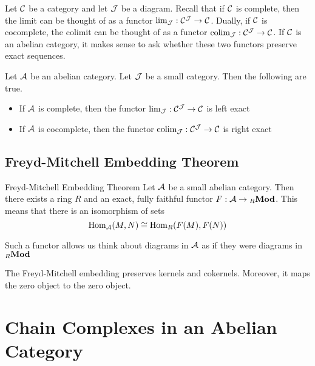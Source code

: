 \documentclass[a4paper]{article}
\begin{document}
Let $\mathcal{C}$ be a category and let $\mathcal{J}$ be a diagram. Recall that if $\mathcal{C}$ is complete, then the limit can be thought of as a functor $\lim_{\mathcal{J}}:\mathcal{C}^{\mathcal{J}}\to\mathcal{C}$. Dually, if $\mathcal{C}$ is cocomplete, the colimit can be thought of as a functor $\operatorname*{colim}_{\mathcal{J}}:\mathcal{C}^{\mathcal{J}}\to\mathcal{C}$. If $\mathcal{C}$ is an abelian category, it makes sense to ask whether these two functors preserve exact sequences. 

\begin{prp}{}{} Let $\mathcal{A}$ be an abelian category. Let $\mathcal{J}$ be a small category. Then the following are true. 
\begin{itemize}
\item If $\mathcal{A}$ is complete, then the functor $\lim_{\mathcal{J}}:\mathcal{C}^{\mathcal{J}}\to\mathcal{C}$ is left exact
\item If $\mathcal{A}$ is cocomplete, then the functor $\operatorname*{colim}_{\mathcal{J}}:\mathcal{C}^{\mathcal{J}}\to\mathcal{C}$ is right exact
\end{itemize}
\end{prp}

\subsection{Freyd-Mitchell Embedding Theorem}
\begin{thm}{Freyd-Mitchell Embedding Theorem}{} Let $\mathcal{A}$ be a small abelian category. Then there exists a ring $R$ and an exact, fully faithful functor $F:\mathcal{A}\to{_R\bold{Mod}}$. This means that there is an isomorphism of sets $$\operatorname{Hom}_{\mathcal{A}}(M,N)\cong\operatorname{Hom}_R(F(M),F(N))$$ 
\end{thm}

Such a functor allows us think about diagrams in $\mathcal{A}$ as if they were diagrams in ${_R\bold{Mod}}$

\begin{lmm}{}{} The Freyd-Mitchell embedding preserves kernels and cokernels. Moreover, it maps the zero object to the zero object. 
\end{lmm}

\pagebreak
\section{Chain Complexes in an Abelian Category}
\end{document}
